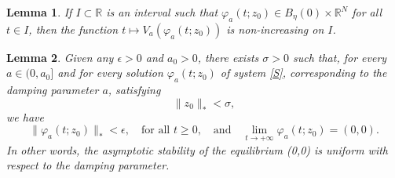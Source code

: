 \documentclass[10pt,a4paper]{amsart}
\newtheorem{lemma}{Lemma}
\begin{document}
\begin{lemma}\label{L4}
	If $I\subset\mathbb{R}$ is an interval such that $\varphi_a(t;z_0)\in B_\eta(0)\times \mathbb{R}^N$ for all $t\in I$, then the function $t\mapsto V_a(\varphi_a(t;z_0))$ is non-increasing on $I$.
\end{lemma}

\begin{lemma}\label{L5}
Given any $\epsilon > 0$ and $a_0>0$, there exists $\sigma > 0$ such that, for every $a\in (0,a_0]$ and for every solution $\varphi_a(t;z_0)$ of system \eqref{S}, corresponding to the damping parameter $a$, satisfying
$$
\|z_0\|_* < \sigma,
$$
we have
$$
\|\varphi_a(t;z_0)\|_* < \epsilon, \quad \text{for all } t \geq 0,\quad \text{and}\quad \lim_{t \to +\infty} \varphi_a(t;z_0) = (0,0).
$$
In other words, the asymptotic stability of the equilibrium (0,0) is uniform with respect to the damping parameter.
\end{lemma}
\end{document}
